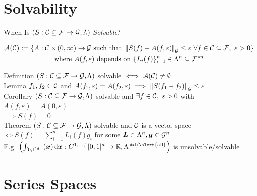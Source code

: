 \documentclass[11pt,compress,xcolor={usenames,dvipsnames},aspectratio=169]{beamer}
\newcommand{\sol}{S}
\newcommand{\app}{A}
\begin{document}
\section{Solvability}
\begin{frame}{When Is $(S:\cc \subseteq \cf\to\cg,\Lambda)$ \emph{Solvable}?}

\vspace{-7ex}
\begin{multline*}
     \ca(\cc) : = \{\app: \cc \times (0,\infty) \to \cg \text{ such that } 
\norm[\cg]{\sol(f) - \app(f,\varepsilon) } \le \varepsilon \ \forall f \in \cc \subseteq \cf, \ \varepsilon > 0 \}
  \\
  \text{where $A(f,\varepsilon)$ depends on } \{L_i(f)\}_{i=1}^n \in \Lambda^n \subseteq \cf^{*n}
\end{multline*}

\vspace{-3ex}

\alert{Definition} \quad $(S:\cc \subseteq \cf\to\cg,\Lambda)$ \alert{solvable} $\iff \ca(\cc) \ne \emptyset$\\[1ex]
\alert{Lemma}  \quad $f_1, f_2 \in \cc$  and $A(f_1, \varepsilon) = A(f_2,\varepsilon) \implies \norm[\cg]{S(f_1-f_2)} \le \varepsilon$\\[1ex]
\alert{Corollary} \label{ZeroCorollary} \quad $(S:\cc \subseteq \cf\to\cg,\Lambda)$ \alert{solvable} and $\exists f \in \cc,\  \varepsilon > 0$ with $A(f,\varepsilon) = A(0,\varepsilon)$  \\ \hfill \hfill $\implies S(f) = 0$\\[1ex]
\alert{Theorem} \label{VectorSpaceThm}\quad $(S:\cc \subseteq \cf\to\cg,\Lambda)$ \alert{solvable} and $\cc$ is a \alert{vector space} \\ \hfill \hfill 
$\iff S(f) = \sum_{i=1}^n L_i(f) g_i$ for some $\vL \in \Lambda^n, \vg \in \cg^n$  \hyperlink{VectorSpaceThmProof}{}\\[1ex]
E.g. $\left(\int_{[0,1]^d} \cdot (\vx) \, \dif \vx: C^{1,\ldots,1}[0,1]^d\to\reals,\Lambda^{\textup{std/\alert{all}}}\right)$ is unsolvable/\alert{solvable}
    
\end{frame}

\section{Series Spaces}
\end{document}
